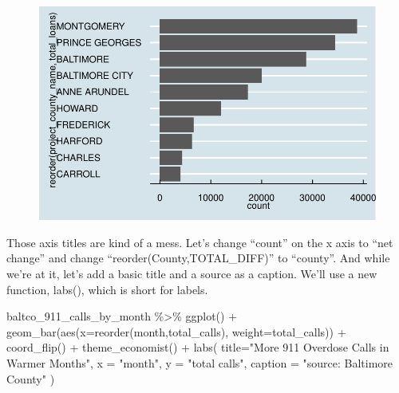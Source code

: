 \documentclass[
  letterpaper,
  DIV=11,
  numbers=noendperiod]{scrreprt}
\newenvironment{Shaded}{\begin{snugshade}}{\end{snugshade}}
\newcommand{\AttributeTok}[1]{\textcolor[rgb]{0.40,0.45,0.13}{#1}}
\newcommand{\FunctionTok}[1]{\textcolor[rgb]{0.28,0.35,0.67}{#1}}
\newcommand{\NormalTok}[1]{\textcolor[rgb]{0.00,0.23,0.31}{#1}}
\newcommand{\SpecialCharTok}[1]{\textcolor[rgb]{0.37,0.37,0.37}{#1}}
\newcommand{\StringTok}[1]{\textcolor[rgb]{0.13,0.47,0.30}{#1}}
\begin{document}
\begin{figure}[H]

{\centering \includegraphics{./visualizing-for-reporting_files/figure-pdf/unnamed-chunk-10-1.pdf}

}

\end{figure}

Those axis titles are kind of a mess. Let's change ``count'' on the x
axis to ``net change'' and change ``reorder(County,TOTAL\_DIFF)'' to
``county''. And while we're at it, let's add a basic title and a source
as a caption. We'll use a new function, labs(), which is short for
labels.

\begin{Shaded}
\begin{Highlighting}[]
\NormalTok{baltco\_911\_calls\_by\_month }\SpecialCharTok{\%\textgreater{}\%}
  \FunctionTok{ggplot}\NormalTok{() }\SpecialCharTok{+}
  \FunctionTok{geom\_bar}\NormalTok{(}\FunctionTok{aes}\NormalTok{(}\AttributeTok{x=}\FunctionTok{reorder}\NormalTok{(month,total\_calls), }\AttributeTok{weight=}\NormalTok{total\_calls)) }\SpecialCharTok{+}
  \FunctionTok{coord\_flip}\NormalTok{() }\SpecialCharTok{+} 
  \FunctionTok{theme\_economist}\NormalTok{() }\SpecialCharTok{+}
  \FunctionTok{labs}\NormalTok{(}
    \AttributeTok{title=}\StringTok{"More 911 Overdose Calls in Warmer Months"}\NormalTok{,}
    \AttributeTok{x =} \StringTok{"month"}\NormalTok{,}
    \AttributeTok{y =} \StringTok{"total calls"}\NormalTok{,}
    \AttributeTok{caption =} \StringTok{"source: Baltimore County"}
\NormalTok{  )}
\end{Highlighting}
\end{Shaded}
\end{document}
